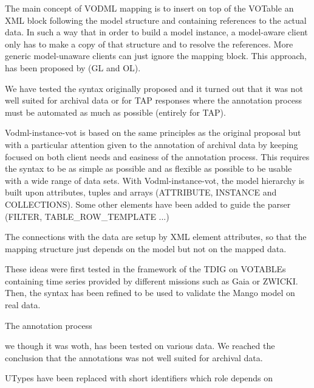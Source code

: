 \documentclass[11pt,a4paper]{ivoa}
\begin{document}
The main concept of VODML mapping is to insert on  top of the VOTable an XML block following the model structure and containing references to the actual data.
In such a way that in order to build a model instance, a model-aware client only has to make a copy of that structure and to resolve the references. More generic model-unaware clients can just ignore the mapping block. This approach, has been proposed by (GL and OL). 

We have tested the syntax originally proposed and it turned out that it was not well suited for archival data or for TAP responses where the annotation process must be automated as much as possible (entirely for TAP). 

Vodml-instance-vot is based on the same principles as the original proposal but with a particular attention given to the annotation of archival data by keeping focused on both client needs and easiness of the annotation process.
This requires the syntax to be as simple as possible and as flexible as possible to be usable with a wide range of data sets.
With Vodml-instance-vot, the model hierarchy is built upon attributes, tuples and arrays (ATTRIBUTE, INSTANCE and COLLECTIONS). Some other elements have been added to guide the parser (FILTER, TABLE\_ROW\_TEMPLATE ...)

The connections with the data are setup by XML element attributes, so that the mapping structure just depends on the model but not on the mapped data.

These ideas were first tested in the framework of the TDIG on VOTABLEs containing time series provided by different missions such as Gaia or ZWICKI. 
Then, the syntax has been refined to be used to validate the Mango model on real data.

\iffalse
 The annotation process 

we though it was woth, has been tested on various data. We reached the conclusion that the annotations was not well suited for archival data.

 

 UTypes have been replaced with short identifiers which role depends on 
\end{document}
